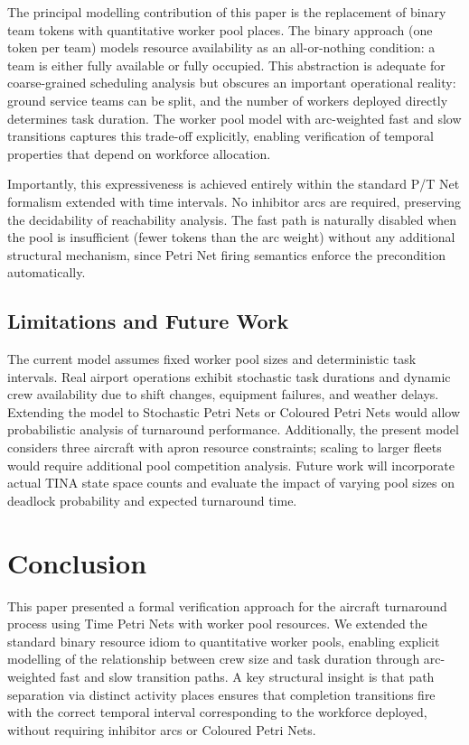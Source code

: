 \documentclass[conference]{IEEEtran}
\begin{document}
The principal modelling contribution of this paper is the replacement of binary
team tokens with quantitative worker pool places. The binary approach (one token
per team) models resource availability as an all-or-nothing condition: a team is
either fully available or fully occupied. This abstraction is adequate for
coarse-grained scheduling analysis but obscures an important operational reality:
ground service teams can be split, and the number of workers deployed directly
determines task duration. The worker pool model with arc-weighted fast and slow
transitions captures this trade-off explicitly, enabling verification of temporal
properties that depend on workforce allocation.

Importantly, this expressiveness is achieved entirely within the standard P/T
Net formalism extended with time intervals. No inhibitor arcs are required,
preserving the decidability of reachability analysis. The fast path is naturally
disabled when the pool is insufficient (fewer tokens than the arc weight) without
any additional structural mechanism, since Petri Net firing semantics enforce the
precondition automatically.

\subsection{Limitations and Future Work}

The current model assumes fixed worker pool sizes and deterministic task
intervals. Real airport operations exhibit stochastic task durations and dynamic
crew availability due to shift changes, equipment failures, and weather delays.
Extending the model to Stochastic Petri Nets or Coloured Petri Nets would allow
probabilistic analysis of turnaround performance. Additionally, the present model
considers three aircraft with apron resource constraints; scaling to larger
fleets would require additional pool competition analysis. Future work will
incorporate actual TINA state space counts and evaluate the impact of varying
pool sizes on deadlock probability and expected turnaround time.


\section{Conclusion}

This paper presented a formal verification approach for the aircraft turnaround
process using Time Petri Nets with worker pool resources. We extended the
standard binary resource idiom to quantitative worker pools, enabling explicit
modelling of the relationship between crew size and task duration through
arc-weighted fast and slow transition paths. A key structural insight is that
path separation via distinct activity places ensures that completion transitions
fire with the correct temporal interval corresponding to the workforce deployed,
without requiring inhibitor arcs or Coloured Petri Nets.
\end{document}

